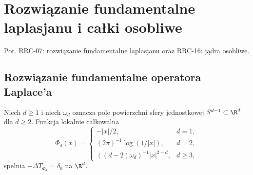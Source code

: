 \setcounter{section}{17}
\section{Rozwiązanie fundamentalne laplasjanu i całki osobliwe}
\label{sec:dt-singular}
\providecommand{\atlasref}[2]{#2}
Por. \atlasref{PDE-07::thm:pde7-laplace}{RRC-07: rozwiązanie fundamentalne laplasjanu}
oraz \atlasref{PDE-16::lem:pde16-distr-kernel}{RRC-16: jądra osobliwe}.
\subsection{Rozwiązanie fundamentalne operatora Laplace'a}
\begin{twierdzenie}
\label{thm:dt-laplace}
Niech $d\ge1$ i niech $\omega_d$ oznacza pole powierzchni
sfery jednostkowej $S^{d-1}\subset\R^d$ dla $d\ge2$.
Funkcja lokalnie całkowalna
\begin{equation}\label{eq:dt-laplace-fundamental}
 \Phi_d(x)=\begin{cases}
 -|x|/2,&d=1,\\
 (2\pi)^{-1}\log(1/|x|),&d=2,\\
 ((d-2)\omega_d)^{-1}|x|^{2-d},&d\ge3,
 \end{cases}
\end{equation}
spełnia $-\Delta T_{\Phi_d}=\delta_0$ na $\R^d$.
\end{twierdzenie}
